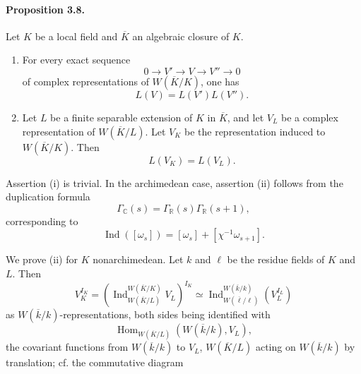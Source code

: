 \documentclass[10pt]{article}
\newcommand{\C}{\mathbb C}
\newcommand{\Hom}{\operatorname{Hom}}
\newcommand{\Ind}{\operatorname{Ind}}
\providecommand{\R}{\mathbb R}
\begin{document}
\paragraph{Proposition 3.8.} Let \(K\) be a local field and \(\overline K\) an algebraic closure of \(K\).
\begin{enumerate}[label=(\roman*)]
\item For every exact sequence
\[
0\longrightarrow V'\longrightarrow V\longrightarrow V''\longrightarrow0
\]
of complex representations of \(W(\overline K/K)\), one has
\[
\tag{3.8.1}
L(V)=L(V')L(V'').
\]
\item Let \(L\) be a finite separable extension of \(K\) in \(\overline K\), and let \(V_L\) be a complex representation of \(W(\overline K/L)\). Let \(V_K\) be the representation induced to \(W(\overline K/K)\). Then
\[
\tag{3.8.2}
L(V_K)=L(V_L).
\]
\end{enumerate}

Assertion (i) is trivial. In the archimedean case, assertion (ii) follows from the duplication formula
\[
\Gamma_\C(s)=\Gamma_\R(s)\Gamma_\R(s+1),
\]
corresponding to
\[
\Ind([\omega_s])=[\omega_s]+[\chi^{-1}\omega_{s+1}].
\]

We prove (ii) for \(K\) nonarchimedean. Let \(k\) and \(\ell\) be the residue fields of \(K\) and \(L\). Then
\[
V_K^{I_K}=
\left(\Ind_{W(\overline K/L)}^{W(\overline K/K)}V_L\right)^{I_K}
\simeq
\Ind_{W(\overline\ell/\ell)}^{W(\overline k/k)}(V_L^{I_L})
\]
as \(W(\overline k/k)\)-representations, both sides being identified with
\[
\Hom_{W(\overline K/L)}(W(\overline k/k),V_L),
\]
the covariant functions from \(W(\overline k/k)\) to \(V_L\), \(W(\overline K/L)\) acting on \(W(\overline k/k)\) by translation; cf. the commutative diagram
\end{document}
